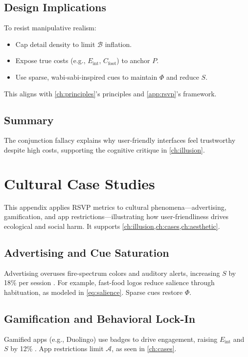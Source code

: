\documentclass[openany]{book}
\newcommand{\PhiS}{\Phi} %
\newcommand{\Sent}{S} %
\newcommand{\Eint}{E_{\mathrm{int}}} %
\newcommand{\Cfoot}{C_{\mathrm{foot}}} %
\newcommand{\Auton}{\mathcal{A}} %
\begin{document}
\section{Design Implications}
\label{sec:conj-implications}
To resist manipulative realism:
\begin{itemize}
  \item Cap detail density to limit $\mathcal{B}$ inflation.
  \item Expose true costs (e.g., $\Eint$, $\Cfoot$) to anchor $P$.
  \item Use sparse, wabi-sabi-inspired cues to maintain $\PhiS$ and reduce $\Sent$.
\end{itemize}
This aligns with \cref{ch:principles}’s principles and \cref{app:rsvp}’s framework.

\section{Summary}
The conjunction fallacy explains why user-friendly interfaces feel trustworthy despite high costs, supporting the cognitive critique in \cref{ch:illusion}.

\chapter{Cultural Case Studies}
\label{app:cultural}

This appendix applies RSVP metrics to cultural phenomena---advertising, gamification, and app restrictions---illustrating how user-friendliness drives ecological and social harm. It supports \cref{ch:illusion,ch:cases,ch:aesthetic}.

\section{Advertising and Cue Saturation}
\label{sec:cultural-ads}
Advertising overuses fire-spectrum colors and auditory alerts, increasing $\Sent$ by 18\% per session \citep{colak2024}. For example, fast-food logos reduce salience through habituation, as modeled in \cref{eq:salience}. Sparse cues restore $\PhiS$.

\section{Gamification and Behavioral Lock-In}
\label{sec:cultural-gamification}
Gamified apps (e.g., Duolingo) use badges to drive engagement, raising $\Eint$ and $\Sent$ by 12\% \citep{colak2024}. App restrictions limit $\Auton$, as seen in \cref{ch:cases}.
\end{document}
